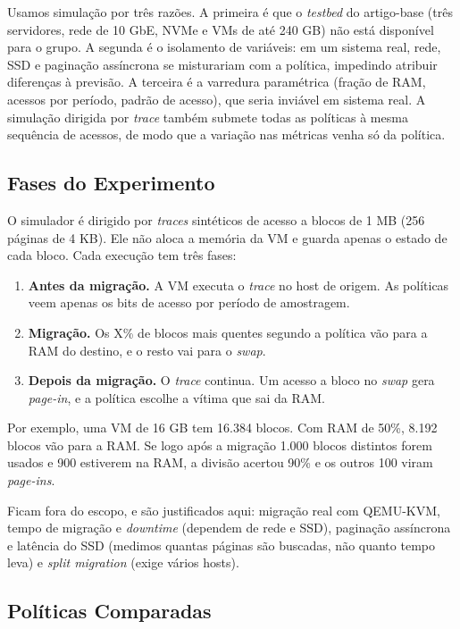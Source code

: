 \documentclass[12pt]{article}
\begin{document}
Usamos simulação por três razões. A primeira é que o \textit{testbed} do artigo-base (três servidores, rede de 10 GbE, NVMe e VMs de até 240 GB) não está disponível para o grupo. A segunda é o isolamento de variáveis: em um sistema real, rede, SSD e paginação assíncrona se misturariam com a política, impedindo atribuir diferenças à previsão. A terceira é a varredura paramétrica (fração de RAM, acessos por período, padrão de acesso), que seria inviável em sistema real. A simulação dirigida por \textit{trace} também submete todas as políticas à mesma sequência de acessos, de modo que a variação nas métricas venha só da política.

\subsection{Fases do Experimento}

O simulador é dirigido por \textit{traces} sintéticos de acesso a blocos de 1 MB (256 páginas de 4 KB). Ele não aloca a memória da VM e guarda apenas o estado de cada bloco. Cada execução tem três fases:

\begin{enumerate}
\item \textbf{Antes da migração.} A VM executa o \textit{trace} no host de origem. As políticas veem apenas os bits de acesso por período de amostragem.
\item \textbf{Migração.} Os X\% de blocos mais quentes segundo a política vão para a RAM do destino, e o resto vai para o \textit{swap}.
\item \textbf{Depois da migração.} O \textit{trace} continua. Um acesso a bloco no \textit{swap} gera \textit{page-in}, e a política escolhe a vítima que sai da RAM.
\end{enumerate}

Por exemplo, uma VM de 16 GB tem 16.384 blocos. Com RAM de 50\%, 8.192 blocos vão para a RAM. Se logo após a migração 1.000 blocos distintos forem usados e 900 estiverem na RAM, a divisão acertou 90\% e os outros 100 viram \textit{page-ins}.

Ficam fora do escopo, e são justificados aqui: migração real com QEMU-KVM, tempo de migração e \textit{downtime} (dependem de rede e SSD), paginação assíncrona e latência do SSD (medimos quantas páginas são buscadas, não quanto tempo leva) e \textit{split migration} (exige vários hosts).

\subsection{Políticas Comparadas}
\end{document}
